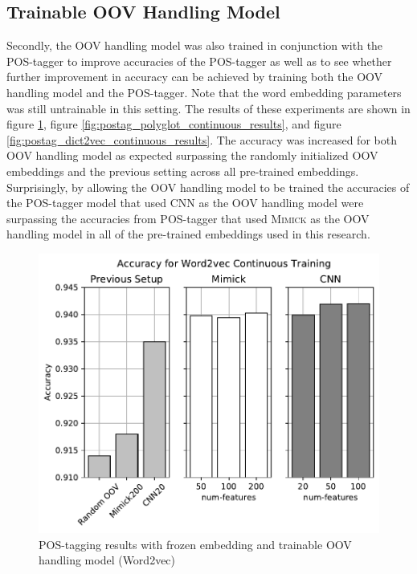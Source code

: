       \subsection{Trainable OOV Handling Model}
      Secondly, the OOV handling model was also trained in conjunction
      with the POS-tagger to improve accuracies of the POS-tagger as
      well as to see whether further improvement in accuracy can be
      achieved by training both the OOV handling model and the
      POS-tagger. Note that the word embedding parameters was still
      untrainable in this setting. The results of these experiments
      are shown in figure
      \ref{fig:postag_word2vec_continuous_results}, figure
      \ref{fig:postag_polyglot_continuous_results}, and figure
      \ref{fig:postag_dict2vec_continuous_results}. The accuracy was
      increased for both OOV handling model as expected surpassing the
      randomly initialized OOV embeddings and the previous setting
      across all pre-trained embeddings. Surprisingly, by allowing the
      OOV handling model to be trained the accuracies of the
      POS-tagger model that used CNN as the OOV handling model were
      surpassing the accuracies from POS-tagger that used
      \textsc{Mimick} as the OOV handling model in all of the
      pre-trained embeddings used in this research.
      \begin{figure}[h]
        \centering
        \includegraphics[width=0.8\linewidth]{images/continuous_word2vec.pdf}
        \caption{POS-tagging results with frozen embedding and trainable OOV handling model (Word2vec)}
        \label{fig:postag_word2vec_continuous_results}
      \end{figure}
